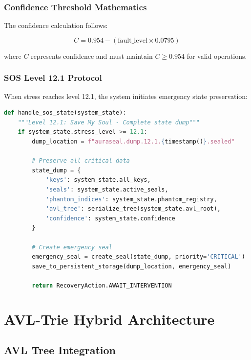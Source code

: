 \documentclass[12pt,a4paper]{report}
\theoremstyle{definition}
\begin{document}
\subsection{Confidence Threshold Mathematics}

The confidence calculation follows:

\begin{equation}
C = 0.954 - (\text{fault\_level} \times 0.0795)
\end{equation}

where $C$ represents confidence and must maintain $C \geq 0.954$ for valid operations.

\subsection{SOS Level 12.1 Protocol}

When stress reaches level 12.1, the system initiates emergency state preservation:

\begin{lstlisting}[language=Python, caption=SOS Protocol Implementation]
def handle_sos_state(system_state):
    """Level 12.1: Save My Soul - Complete state dump"""
    if system_state.stress_level >= 12.1:
        dump_location = f"auraseal.dump.12.1.{timestamp()}.sealed"
        
        # Preserve all critical data
        state_dump = {
            'keys': system_state.all_keys,
            'seals': system_state.active_seals,
            'phantom_indices': system_state.phantom_registry,
            'avl_tree': serialize_tree(system_state.avl_root),
            'confidence': system_state.confidence
        }
        
        # Create emergency seal
        emergency_seal = create_seal(state_dump, priority='CRITICAL')
        save_to_persistent_storage(dump_location, emergency_seal)
        
        return RecoveryAction.AWAIT_INTERVENTION
\end{lstlisting}


\chapter{AVL-Trie Hybrid Architecture}

\section{AVL Tree Integration}
\end{document}
